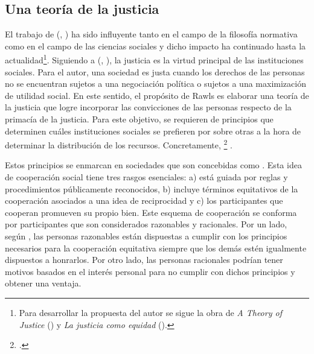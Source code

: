\subsection{Una teoría de la justicia} \label{sec2.3}

El trabajo de \citeauthor{Rawls_1971} (\citeyear{Rawls_1971}, \citeyear{Rawls_2002}) ha sido influyente tanto en el campo de la filosofía normativa como en el campo de las ciencias sociales y dicho impacto ha continuado hasta la actualidad\footnote{Para desarrollar la propuesta del autor se sigue la obra de \textit{A Theory of Justice} (\citeyear{Rawls_1971})  y \textit{La justicia como equidad} (\citeyear{Rawls_2002}).}. Siguiendo a \citeauthor{Rawls_1971} (\citeyear{Rawls_1971}, \citeyear{Rawls_2002}), la justicia es la virtud principal de las instituciones sociales. Para el autor, una sociedad es justa cuando los derechos de las personas no se encuentran sujetos a una negociación política o sujetos a una maximización de utilidad social. En este sentido, el propósito de Rawls es elaborar una teoría de la justicia que logre incorporar las convicciones de las personas respecto de la primacía de la justicia. Para este objetivo, se requieren de principios que determinen cuáles instituciones sociales se prefieren por sobre otras a la hora de determinar la distribución de los recursos. Concretamente, \footnote{ \citep[p. 4]{Rawls_1971}.} \citep[p. 4]{Rawls_1971}.

Estos principios se enmarcan en sociedades que son concebidas como  \citep[p. 28]{Rawls_2002}. Esta idea de cooperación social tiene tres rasgos esenciales: a) está guiada por reglas y procedimientos públicamente reconocidos, b) incluye términos equitativos de la cooperación asociados a una idea de reciprocidad y c) los participantes que cooperan promueven su propio bien. Este esquema de cooperación se conforma por participantes que son considerados razonables y racionales. Por un lado, según \cite{Rawls_2002}, las personas razonables están dispuestas a cumplir con los principios necesarios para la cooperación equitativa siempre que los demás estén igualmente dispuestos a honrarlos. Por otro lado, las personas racionales podrían tener motivos basados en el interés personal para no cumplir con dichos principios y obtener una ventaja. 

